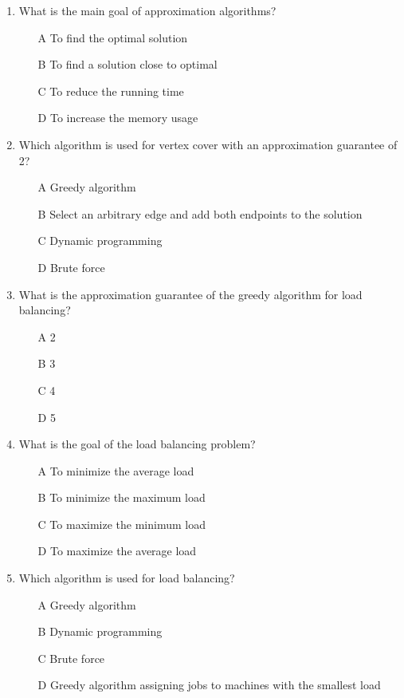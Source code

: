 \documentclass[11pt]{article}
\begin{document}
\begin{enumerate}

\item What is the main goal of approximation algorithms?
\begin{enumerate}
\item[A] To find the optimal solution
\item[B] To find a solution close to optimal
\item[C] To reduce the running time
\item[D] To increase the memory usage
\end{enumerate}

\item Which algorithm is used for vertex cover with an approximation guarantee of 2?
\begin{enumerate}
\item[A] Greedy algorithm
\item[B] Select an arbitrary edge and add both endpoints to the solution
\item[C] Dynamic programming
\item[D] Brute force
\end{enumerate}

\item What is the approximation guarantee of the greedy algorithm for load balancing?
\begin{enumerate}
\item[A] 2
\item[B] 3
\item[C] 4
\item[D] 5
\end{enumerate}

\item What is the goal of the load balancing problem?
\begin{enumerate}
\item[A] To minimize the average load
\item[B] To minimize the maximum load
\item[C] To maximize the minimum load
\item[D] To maximize the average load
\end{enumerate}

\item Which algorithm is used for load balancing?
\begin{enumerate}
\item[A] Greedy algorithm
\item[B] Dynamic programming
\item[C] Brute force
\item[D] Greedy algorithm assigning jobs to machines with the smallest load
\end{enumerate}


\end{enumerate}
\end{document}
